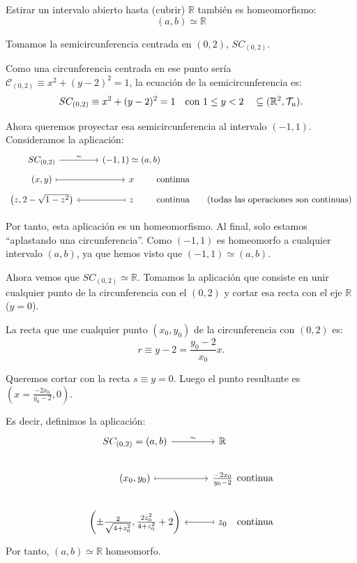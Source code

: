 \begin{ejem}[$(\mathbb{R}, \mc T_u)$]
Estirar un intervalo abierto hasta (cubrir) $\mathbb{R}$ también es homeomorfismo:
\[
    (a, b) \simeq \mathbb{R}
\]

Tomamos la semicircunferencia centrada en $(0,2)$, $SC_{(0,2)}$.

Como una circunferencia centrada en ese punto sería $\mathcal{C}_{(0,2)} \equiv x^2 + (y-2)^2 = 1$, la ecuación de la semicircunferencia es:
\[
    SC_{(0,2)} \equiv x^2 + (y-2)^2 = 1 \quad \text{con } 1 \le y < 2 \quad \subseteq (\mathbb{R}^2, \mathcal{T}_u).
\]

Ahora queremos proyectar esa semicircunferencia al intervalo $(-1, 1)$. Consideramos la aplicación:
$$\bt
    SC_{(0,2)}  \rar{\sim} & (-1, 1) \simeq  (a, b) \\[-5mm]
    (x, y)  \rarmaps & x &[-13mm] \text{continua} \\[-5mm]
    \left(z, 2 - \sqrt{1 - z^2}\right) & \arrow[mapsto]{l} z &[-13mm] \text{continua} &[-13mm] & \text{(todas las operaciones son continuas)}
   \et $$

Por tanto, esta aplicación es un homeomorfismo. Al final, solo estamos ``aplastando una circunferencia''. Como $(-1, 1)$ es homeomorfo a cualquier intervalo $(a, b)$, ya que hemos visto que $(-1, 1) \simeq (a, b)$.

Ahora vemos que $SC_{(0,2)} \simeq \mathbb{R}$. Tomamos la aplicación que consiste en unir cualquier punto de la circunferencia con el $(0, 2)$ y cortar esa recta con el eje $\mathbb{R}$ ($y = 0$).

La recta que une cualquier punto $(x_0, y_0)$ de la circunferencia con $(0, 2)$ es:
\[r \equiv y - 2 = \frac{y_0 - 2}{x_0} x.\]

Queremos cortar con la recta $s \equiv y = 0$. Luego el punto resultante es $\left(x = \frac{-2x_0}{y_0 - 2}, 0\right)$.

Es decir, definimos la aplicación:
$$\bt SC_{(0,2)} = (a,b) \rar{\sim} & \mathbb{R} \\ (x_0, y_0) \rarmaps & \frac{-2x_0}{y_0 - 2} &[-10mm] \text{continua} \\ \left( \pm \frac{2}{\sqrt{4 + z_0^2}}, \frac{2z_0^2}{4 + z_0^2} + 2 \right) & \arrow[mapsto]{l} z_0 & \text{continua} \et$$
Por tanto, $(a, b) \simeq \mathbb{R}$ homeomorfo.
\end{ejem}
